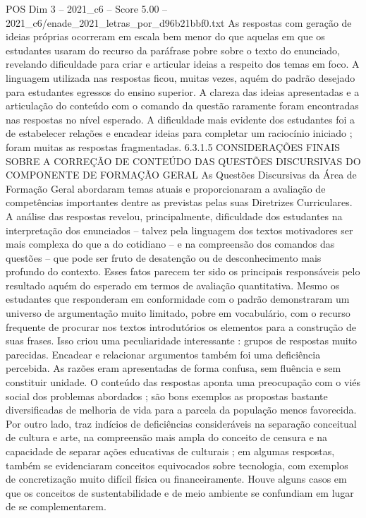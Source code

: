 \begin{textsample}{POS Dim 3 – 2021\_c6 – Score 5.00 – 2021\_c6/enade\_2021\_letras\_por\_d96b21bbf0.txt}
As respostas com geração de ideias próprias ocorreram em escala bem menor do que aquelas em que os estudantes usaram do recurso da paráfrase pobre sobre o texto do enunciado, revelando dificuldade para criar e articular ideias a respeito dos temas em foco.
A linguagem utilizada nas respostas ficou, muitas vezes, aquém do padrão desejado para estudantes egressos do ensino superior.
A clareza das ideias apresentadas e a articulação do conteúdo com o comando da questão raramente foram encontradas nas respostas no nível esperado.
A dificuldade mais evidente dos estudantes foi a de estabelecer relações e encadear ideias para completar um raciocínio iniciado ; foram muitas as respostas fragmentadas. 6.3.1.5 CONSIDERAÇÕES FINAIS SOBRE A CORREÇÃO DE CONTEÚDO DAS QUESTÕES DISCURSIVAS DO COMPONENTE DE FORMAÇÃO GERAL As Questões Discursivas da Área de Formação Geral abordaram temas atuais e proporcionaram a avaliação de competências importantes dentre as previstas pelas suas Diretrizes Curriculares.
A análise das respostas revelou, principalmente, dificuldade dos estudantes na interpretação dos enunciados – talvez pela linguagem dos textos motivadores ser mais complexa do que a do cotidiano – e na compreensão dos comandos das questões – que pode ser fruto de desatenção ou de desconhecimento mais profundo do contexto.
Esses fatos parecem ter sido os principais responsáveis pelo resultado aquém do esperado em termos de avaliação quantitativa.
Mesmo os estudantes que responderam em conformidade com o padrão demonstraram um universo de argumentação muito limitado, pobre em vocabulário, com o recurso frequente de procurar nos textos introdutórios os elementos para a construção de suas frases.
Isso criou uma peculiaridade interessante : grupos de respostas muito parecidas.
Encadear e relacionar argumentos também foi uma deficiência percebida.
As razões eram apresentadas de forma confusa, sem fluência e sem constituir unidade.
O conteúdo das respostas aponta uma preocupação com o viés social dos problemas abordados ; são bons exemplos as propostas bastante diversificadas de melhoria de vida para a parcela da população menos favorecida.
Por outro lado, traz indícios de deficiências consideráveis na separação conceitual de cultura e arte, na compreensão mais ampla do conceito de censura e na capacidade de separar ações educativas de culturais ; em algumas respostas, também se evidenciaram conceitos equivocados sobre tecnologia, com exemplos de concretização muito difícil física ou financeiramente.
Houve alguns casos em que os conceitos de sustentabilidade e de meio ambiente se confundiam em lugar de se complementarem.

\end{textsample}
